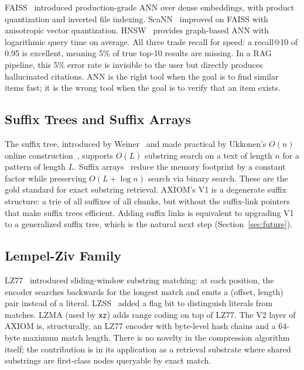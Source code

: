 \documentclass[conference]{IEEEtran}
\begin{document}
FAISS~\cite{johnson2019faiss} introduced production-grade ANN over dense embeddings, with product quantization and inverted file indexing. ScaNN~\cite{guo2020scann} improved on FAISS with anisotropic vector quantization. HNSW~\cite{malkov2018hnsw} provides graph-based ANN with logarithmic query time on average. All three trade recall for speed: a recall@10 of 0.95 is excellent, meaning 5\% of true top-10 results are missing. In a RAG pipeline, this 5\% error rate is invisible to the user but directly produces hallucinated citations. ANN is the right tool when the goal is to find similar items fast; it is the wrong tool when the goal is to verify that an item exists.

\subsection{Suffix Trees and Suffix Arrays}

The suffix tree, introduced by Weiner~\cite{weiner1973} and made practical by Ukkonen's $O(n)$ online construction~\cite{ukkonen1995}, supports $O(L)$ substring search on a text of length $n$ for a pattern of length $L$. Suffix arrays~\cite{manber1993} reduce the memory footprint by a constant factor while preserving $O(L + \log n)$ search via binary search. These are the gold standard for exact substring retrieval. AXIOM's V1 is a degenerate suffix structure: a trie of all suffixes of all chunks, but without the suffix-link pointers that make suffix trees efficient. Adding suffix links is equivalent to upgrading V1 to a generalized suffix tree, which is the natural next step (Section~\ref{sec:future}).

\subsection{Lempel-Ziv Family}

LZ77~\cite{ziv1977lz77} introduced sliding-window substring matching: at each position, the encoder searches backwards for the longest match and emits a (offset, length) pair instead of a literal. LZSS~\cite{storer1982lzss} added a flag bit to distinguish literals from matches. LZMA (used by \texttt{xz}) adds range coding on top of LZ77. The V2 layer of AXIOM is, structurally, an LZ77 encoder with byte-level hash chains and a 64-byte maximum match length. There is no novelty in the compression algorithm itself; the contribution is in its application as a retrieval substrate where shared substrings are first-class nodes queryable by exact match.
\end{document}

